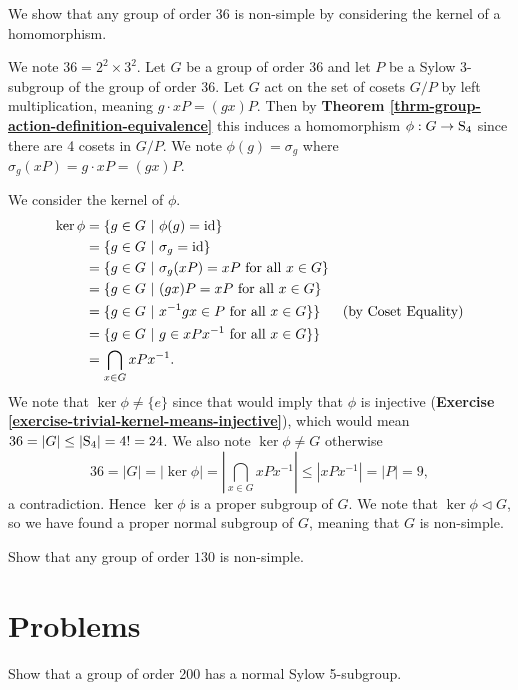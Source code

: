 \begin{example}\label{example-using-kernel-to-show-non-simple}
    We show that any group of order 36 is non-simple by considering the kernel of a homomorphism.

    We note $36 = 2^2 \times 3^2$. Let $G$ be a group of order 36 and let $P$ be a Sylow 3-subgroup of the group of order 36. Let $G$ act on the set of cosets $G/P$ by left multiplication, meaning $g \cdot xP = (gx)P$. Then by \textbf{Theorem \ref{thrm-group-action-definition-equivalence}} this induces a homomorphism $\phi: G \to \mathrm{S}_{4}$ since there are 4 cosets in $G/P$. We note $\phi(g) = \sigma_g$ where $\sigma_g(xP) = g\cdot xP = (gx)P$.

    We consider the kernel of $\phi$.
    \begin{align*}
        \ker\phi &= \{g \in G \ | \  \phi(g) = \mathrm{id}\}\\
        &= \{g \in G \ | \  \sigma_g = \mathrm{id}\}\\
        &= \{g \in G \ | \  \sigma_g(xP) = xP \text{ for all } x \in G\}\\
        &= \{g \in G \ | \  (gx)P = xP \text{ for all } x \in G\}\\
        &= \{g \in G \ | \  x^{-1}gx \in P \text{ for all } x \in G\}\} & \text{(by Coset Equality)}\\
        &= \{g \in G \ | \  g \in xPx^{-1} \text{ for all } x \in G\}\}\\
        &= \bigcap_{x \in G} xPx^{-1}.
    \end{align*}
    We note that $\ker\phi \neq \{e\}$ since that would imply that $\phi$ is injective (\textbf{Exercise \ref{exercise-trivial-kernel-means-injective}}), which would mean $36 = |G| \leq |\mathrm{S}_{4}| = 4! = 24$. We also note $\ker\phi \neq G$ otherwise
    \[
        36 = |G| = |\ker\phi| = \left|\bigcap_{x \in G} xPx^{-1}\right| \leq |xPx^{-1}| = |P| = 9,
    \]
    a contradiction. Hence $\ker\phi$ is a proper subgroup of $G$. We note that $\ker\phi \lhd G$, so we have found a proper normal subgroup of $G$, meaning that $G$ is non-simple.
\end{example}

\begin{exercise}
    Show that any group of order $130$ is non-simple.
\end{exercise}

\newpage

\section{Problems}
\begin{problem}
    Show that a group of order 200 has a normal Sylow 5-subgroup.
\end{problem}

